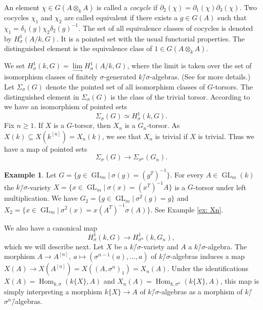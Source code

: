 \documentclass[oneside,reqno]{amsart}
\theoremstyle{definition}
\newtheorem{ex}[theo]{Example}
\newcommand{\Gl}{\operatorname{GL}}
\newcommand{\Hom}{\operatorname{Hom}}
\newcommand{\s}{\sigma}
\newcommand{\ks}{$k$\=/$\s$}
\newcommand{\kn}{k^{[n]}}
\begin{document}
An element $\chi\in G(A\otimes_k A)$ is called a \emph{cocycle} if $\partial_2(\chi)=\partial_1(\chi)\partial_3(\chi)$. Two cocycles $\chi_1$ and $\chi_2$ are called equivalent if there exists a $g\in G(A)$ such that $\chi_1=\delta_1(g)\chi_2\delta_2(g)^{-1}$. The set of all equivalence classes of cocycles is denoted by $H^1_\s(A/k,G)$. It is a pointed set with the usual functorial properties. The distinguished element is the equivalence class of $1\in  G(A\otimes_k A)$.

We set $H^1_\s(k,G)=\lim\limits_{\longrightarrow}H^1_\s(A/k,G)$,
where the limit is taken over the set of isomorphism classes of finitely $\s$-generated \ks-algebras. (See \cite[Section 5]{BachmayrWibmer:TorsorsForDifferenceAlgebraicGroups} for more details.)
Let $\Sigma_\s(G)$ denote the pointed set of all isomorphism classes of $G$-torsors.
The distinguished element in $\Sigma_\s(G)$ is the class of the trivial torsor. According to \cite[Theorem 4.2]{BachmayrWibmer:TorsorsForDifferenceAlgebraicGroups} we have an isomorphism of pointed sets 
$$\Sigma_\s(G)\simeq H^1_\s(k,G).$$
Fix $n\geq 1$. If $X$ is a $G$-torsor, then $X_n$ is a $G_n$-torsor. As $X(k)\subseteq X(\kn)=X_n(k)$, we see that $X_n$ is trivial if $X$ is trivial. Thus we have a map of pointed sets
$$\Sigma_\s(G)\to \Sigma_{\s^n}(G_n).$$

\begin{ex}
Let $G=\{g\in\Gl_m|\ \s(g)=(g^T)^{-1}\}$. For every $A\in\Gl_m(k)$ the \ks-variety $X=\{x\in\Gl_m|\ \s(x)=(x^T)^{-1}A\}$ is a $G$-torsor under left multiplication. We have $G_2=\{g\in\Gl_m|\ \s^2(g)=g\}$ and 	$X_2=\{x\in\Gl_m|\ \s^2(x)=x(A^T)^{-1}\s(A)\}$. See Example \ref{ex: Xn}.

\end{ex}	
We also have a canonical map 
$$H^1_\s(k,G)\to H^1_{\s^n}(k,G_n),$$
which we will describe next. 
Let $X$ be a \ks-variety and $A$ a \ks-algebra. 
The morphism $A\to A^{[n]},\ a \mapsto (\s^{n-1}(a),\ldots,a)$ of \ks-algebras induces a map $X(A)\to X(A^{[n]})=X((A,\s^n)_1)=X_n(A)$.
Under the identifications $X(A)=\Hom_{k,\s}(k\{X\},A)$ and $X_n(A)=\Hom_{k,\s^n}(k\{X\},A)$, this map is simply interpreting a morphism $k\{X\}\to A$ of \ks-algebras as a morphism of $k$\=/$\s^n$\=/algebras.
\end{document}
